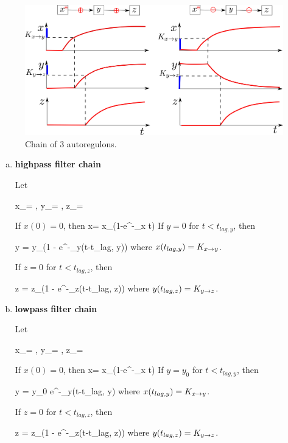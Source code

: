 \begin{figure}[h!]
\centering
\includegraphics[width=4.7in]
{autoregulons/autoreg-cascade.png}
\caption{Chain of 3 autoregulons. 
 }
\label{fig-autoreg-cascade}
\end{figure}

\begin{enumerate}[(a)]
\item {\bf highpass filter chain}

Let 

\beq
x_\infty = \;,\;\;
y_\infty = \;,\;\;
z_\infty = 
\eeq
 
If $x(0)=0$, then
\beq
x=
x_\infty(1-e^{-\alp_x t})
\quad{}
\eeq
If $y=0$ for $t<t_{lag, y}$, then

\beq
y = y_\infty(1 - e^{-\alp_y(t-t_{lag, y})})
\quad{}
\eeq
where $x(t_{lag, y})= K_{x\rightarrow y}$.

If $z=0$ for $t<t_{lag, z}$, then

\beq
z = z_\infty(1 - e^{-\alp_z(t-t_{lag, z})})
\quad{}
\eeq
where $y(t_{lag, z})= K_{y\rightarrow z}$.

\item {\bf lowpass filter chain}

Let 

\beq
x_\infty = \;,\;\;
y_\infty = \;,\;\;
z_\infty = 
\eeq
 
If $x(0)=0$, then
\beq
x=
x_\infty(1-e^{-\alp_x t})
\quad{}
\eeq
If $y=y_0$ for $t<t_{lag, y}$, then

\beq
y = y_0 e^{-\alp_y(t-t_{lag, y})}
\quad{}
\eeq
where $x(t_{lag, y})= K_{x\rightarrow y}$.

If $z=0$ for $t<t_{lag, z}$, then

\beq
z = z_\infty(1 - e^{-\alp_z(t-t_{lag, z})})
\quad{}
\eeq
where $y(t_{lag, z})= K_{y\rightarrow z}$.
\end{enumerate}


